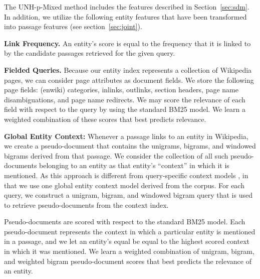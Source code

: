 \documentclass{article}
\begin{document}
The UNH-p-Mixed method includes the features described in Section~\ref{sec:sdm}. 
In addition, we utilize the following entity features that have been transformed into passage features (see section~\ref{sec:joint}).

\textbf{Link Frequency. } An entity's score is equal to the frequency that it is linked to by the candidate passages retrieved for the given query. 

\textbf{Fielded Queries.} Because our entity index represents a collection of Wikipedia pages, we can consider page attributes as document fields. We store the following page fields: (enwiki) categories, inlinks, outlinks, section headers, page name disambiguations, and page name redirects. We may score the relevance of each field with respect to the query by using the standard BM25 model. We learn a weighted combination of these scores that best predicts relevance.

\textbf{Global Entity Context:} Whenever a passage links to an entity in Wikipedia, we create a pseudo-document that contains the unigrams, bigrams, and windowed bigrams derived from that passage.  We consider the collection of all such pseudo-documents belonging to an entity as that entity's ``context'' in which it is mentioned. As this approach is different from query-specific context models  \cite{dalton2014entity}, in that we use one global entity context model derived from the corpus. For each query, we construct a unigram, bigram, and windowed bigram query that is used to retrieve pseudo-documents from the context index.

Pseudo-documents are scored with respect to the standard BM25 model. 
Each pseudo-document represents the context in which a particular entity is mentioned in a passage, and we let an entity's equal be equal to the highest scored context in which it was mentioned. 
We learn a weighted combination of unigram, bigram, and weighted bigram pseudo-document scores that best predicts the relevance of an entity.



\end{document}
